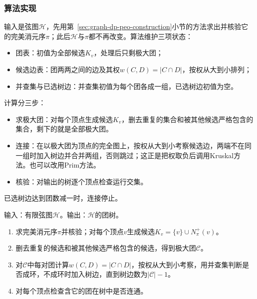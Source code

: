 \subsubsection{算法实现}

输入是弦图$\mathcal H$，先用第~\ref{sec:graph-dp-peo-construction}小节的方法求出并核验它的完美消元序$\pi$；此后$\mathcal H$与$\pi$都不再改变。算法维护三项状态：
\begin{itemize}
  \item 团表：初值为全部候选$K_v$，处理后只剩极大团；
  \item 候选边表：团两两之间的边及其权$w(C,D)=|C\cap D|$，按权从大到小排列；
  \item 并查集与已选树边：并查集初值为每个团各成一组，已选树边初值为空。
\end{itemize}
计算分三步：
\begin{itemize}
  \item 求极大团：对每个顶点生成候选$K_v$，删去重复的集合和被其他候选严格包含的集合，剩下的就是全部极大团。
  \item 连接：在以极大团为顶点的完全图上，按权从大到小考察候选边，两端不在同一组时加入树边并合并两组，否则跳过；这正是把权取负后调用Kruskal方法。也可以改用Prim方法。
  \item 核验：对输出的树逐个顶点检查运行交集。
\end{itemize}
已选树边达到团数减一时，连接停止。

\begin{algorithm}[由弦图构造团树]
\label{alg:graph-dp-clique-tree}
输入：有限弦图$\mathcal H$。输出：$\mathcal H$的团树。
\begin{enumerate}
  \item 求完美消元序$\pi$并核验；对每个顶点$v$生成候选$K_v=\{v\}\cup N^+_\pi(v)$。
  \item 删去重复的候选和被其他候选严格包含的候选，得到极大团$\mathcal C$。
  \item 对$\mathcal C$中每对团计算$w(C,D)=|C\cap D|$，按权从大到小考察，用并查集判断是否成环，不成环时加入树边，直到树边数为$|\mathcal C|-1$。
  \item 对每个顶点检查含它的团在树中是否连通。
\end{enumerate}
\end{algorithm}

